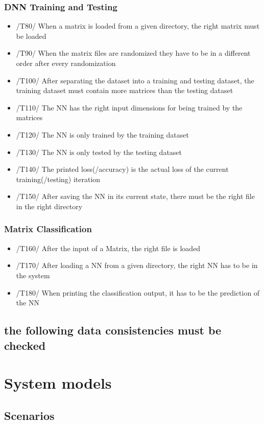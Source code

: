 \documentclass[parskip=full]{scrartcl}
\begin{document}
	\subsubsection{DNN Training and Testing}
		\begin{itemize}
		\item /T80/ When a matrix is loaded from a given directory, the right matrix must be loaded
		\item /T90/ When the matrix files are randomized they have to be in a different order after every randomization
		\item /T100/ After separating the dataset into a training and testing dataset, the training dataset must contain more matrices than the testing dataset
		\item /T110/ The NN has the right input dimensions for being trained by the matrices
		\item /T120/ The NN is only trained by the training dataset
		\item /T130/ The NN is only tested by the testing dataset
		\item /T140/ The printed loss(/accuracy) is the actual loss of the current training(/testing) iteration 
		\item /T150/ After saving the NN in its current state, there must be the right file in the right directory
		\end{itemize}
	\subsubsection{Matrix Classification}
		\begin{itemize}
		\item /T160/ After the input of a Matrix, the right file is loaded
		\item /T170/ After loading a NN from a given directory, the right NN has to be in the system
		\item /T180/ When printing the classification output, it has to be the prediction of the NN
		\end{itemize}
	
\subsection{the following data consistencies must be checked}
\newpage
\section{System models}
\subsection{Scenarios}
\end{document}
